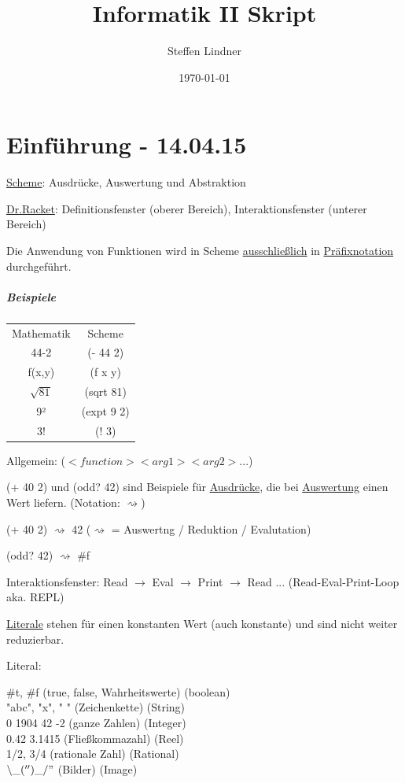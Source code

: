 \documentclass[a4paper, 20pt, openany]{book}
\author{Steffen Lindner}
\title{\vspace{-2cm}Informatik II Skript}
\date{\today{}}
\begin{document}
        
\maketitle
\tableofcontents

\chapter{Einführung - 14.04.15}\uline{Scheme}: Ausdrücke, Auswertung und Abstraktion 

\uline{Dr.Racket}: Definitionsfenster (oberer Bereich), Interaktionsfenster (unterer Bereich) 

Die Anwendung von Funktionen wird in Scheme \uline{ausschließlich} in \uline{Präfixnotation} durchgeführt.

\paragraph{Beispiele}
\begin{flushleft}
	\begin{tabular}{c|c}
		Mathematik & Scheme \\
		44-2 & (- 44 2) \\
		f(x,y) & (f x y) \\
		$\sqrt{81}$& (sqrt 81) \\
		9² & (expt 9 2) \\
		3! & (! 3)  {}
	\end{tabular}
\end{flushleft}

Allgemein: ($<function> <arg1> <arg2> ...$)

(+ 40 2) und (odd? 42) sind Beispiele für \uline{Ausdrücke}, die bei \uline{Auswertung} einen Wert liefern. (Notation: $\rightsquigarrow$)

(+ 40 2) $\rightsquigarrow$ 42 ($\rightsquigarrow$ = Auswertng / Reduktion / Evalutation)

(odd? 42) $\rightsquigarrow$ \#f

Interaktionsfenster: Read $\rightarrow$ Eval $\rightarrow$ Print $\rightarrow$ Read ... (Read-Eval-Print-Loop aka. REPL)

\uline{Literale} stehen für einen konstanten Wert (auch konstante) und sind nicht weiter reduzierbar.

Literal: 

\#t, \#f (true, false, Wahrheitswerte) (boolean) \\
"abc", "x", " " (Zeichenkette) (String) \\
0 1904 42 -2 (ganze Zahlen) (Integer) \\
0.42 3.1415 (Fließkommazahl) (Reel) \\
1/2, 3/4 (rationale Zahl) (Rational) \\
$\backslash\_('')\_/"$ (Bilder) (Image)
\end{document}

